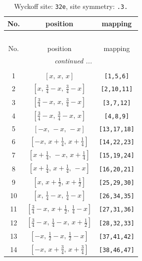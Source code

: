 \documentclass[fleqn,8pt]{jsarticle}
\begin{document}
\renewcommand{\arraystretch}{1.2}
\begin{longtable}{ccc}
\caption{Wyckoff site: {\tt 32e}, site symmetry: {\tt .3.}}
 \\
 \hline \hline
No. & position & mapping \\ \hline \endfirsthead

\multicolumn{2}{l}{\tablename\ \thetable{}} \\
 \hline \hline
No. & position & mapping \\ \hline \endhead

 \hline \hline
\multicolumn{2}{r}{\footnotesize\it continued ...} \\ \endfoot

 \hline \hline
\multicolumn{2}{r}{} \\ \endlastfoot

1 & $\left[ x,\, x,\, x \right]$ & {\tt [1,5,6]} \\ \hline
2 & $\left[ x,\, \frac{3}{4} - x,\, \frac{3}{4} - x \right]$ & {\tt [2,10,11]} \\ \hline
3 & $\left[ \frac{3}{4} - x,\, x,\, \frac{3}{4} - x \right]$ & {\tt [3,7,12]} \\ \hline
4 & $\left[ \frac{3}{4} - x,\, \frac{3}{4} - x,\, x \right]$ & {\tt [4,8,9]} \\ \hline
5 & $\left[ - x,\, - x,\, - x \right]$ & {\tt [13,17,18]} \\ \hline
6 & $\left[ - x,\, x + \frac{1}{4},\, x + \frac{1}{4} \right]$ & {\tt [14,22,23]} \\ \hline
7 & $\left[ x + \frac{1}{4},\, - x,\, x + \frac{1}{4} \right]$ & {\tt [15,19,24]} \\ \hline
8 & $\left[ x + \frac{1}{4},\, x + \frac{1}{4},\, - x \right]$ & {\tt [16,20,21]} \\ \hline
9 & $\left[ x,\, x + \frac{1}{2},\, x + \frac{1}{2} \right]$ & {\tt [25,29,30]} \\ \hline
10 & $\left[ x,\, \frac{1}{4} - x,\, \frac{1}{4} - x \right]$ & {\tt [26,34,35]} \\ \hline
11 & $\left[ \frac{3}{4} - x,\, x + \frac{1}{2},\, \frac{1}{4} - x \right]$ & {\tt [27,31,36]} \\ \hline
12 & $\left[ \frac{3}{4} - x,\, \frac{1}{4} - x,\, x + \frac{1}{2} \right]$ & {\tt [28,32,33]} \\ \hline
13 & $\left[ - x,\, \frac{1}{2} - x,\, \frac{1}{2} - x \right]$ & {\tt [37,41,42]} \\ \hline
14 & $\left[ - x,\, x + \frac{3}{4},\, x + \frac{3}{4} \right]$ & {\tt [38,46,47]} \\ \hline

\end{longtable}
\end{document}
